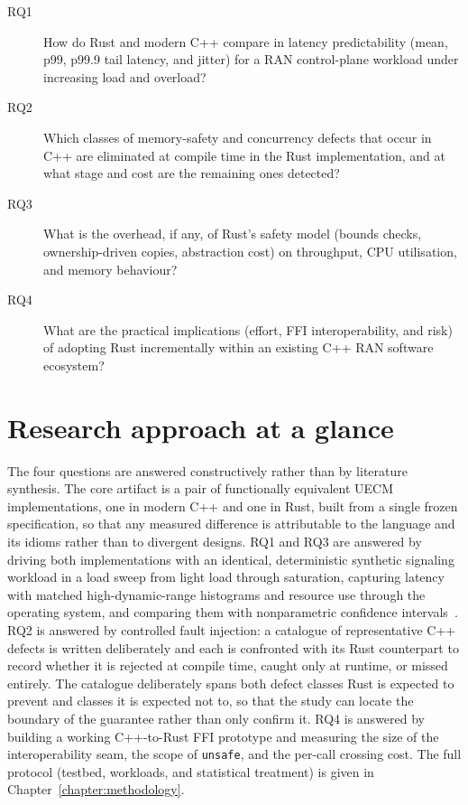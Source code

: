 \documentclass[english,twoside,openright,a4paper,censored,csm,software-track-2020]{HYthesisML}
\begin{document}
\begin{description}
  \item[RQ1] How do Rust and modern C++ compare in latency predictability (mean, p99,
        p99.9 tail latency, and jitter) for a RAN control-plane workload under increasing
        load and overload?
  \item[RQ2] Which classes of memory-safety and concurrency defects that occur in C++ are
        eliminated at compile time in the Rust implementation, and at what stage and cost
        are the remaining ones detected?
  \item[RQ3] What is the overhead, if any, of Rust's safety model (bounds checks,
        ownership-driven copies, abstraction cost) on throughput, CPU utilisation, and
        memory behaviour?
  \item[RQ4] What are the practical implications (effort, FFI interoperability, and risk)
        of adopting Rust incrementally within an existing C++ RAN software ecosystem?
\end{description}

\section{Research approach at a glance}
The four questions are answered constructively rather than by literature synthesis. The core
artifact is a pair of functionally equivalent UECM implementations, one in modern C++ and one in
Rust, built from a single frozen specification, so that any measured difference is attributable
to the language and its idioms rather than to divergent designs. RQ1 and RQ3 are answered by
driving both implementations with an identical, deterministic synthetic signaling workload in a
load sweep from light load through saturation, capturing latency with matched high-dynamic-range
histograms and resource use through the operating system, and comparing them with nonparametric
confidence intervals~\cite{georges2007rigorous}. RQ2 is answered by controlled fault injection:
a catalogue of representative C++ defects is written deliberately and each is confronted with its
Rust counterpart to record whether it is rejected at compile time, caught only at runtime, or
missed entirely. The catalogue deliberately spans both defect classes Rust is expected to
prevent and classes it is expected not to, so that the study can locate the boundary of the
guarantee rather than only confirm it. RQ4 is answered by building a working C++-to-Rust FFI
prototype and measuring
the size of the interoperability seam, the scope of \texttt{unsafe}, and the per-call crossing
cost. The full protocol (testbed, workloads, and statistical treatment) is given in
Chapter~\ref{chapter:methodology}.
\end{document}
